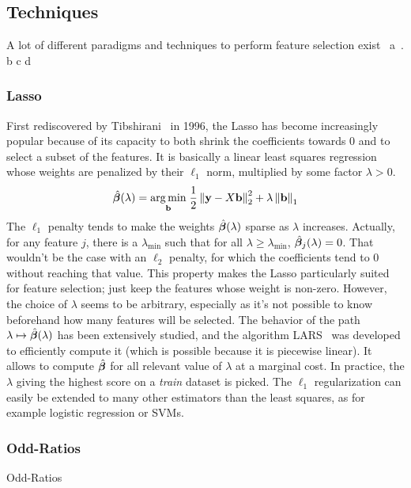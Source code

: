 \subsection{Techniques}\label{subsec:fst}

A lot of different paradigms and techniques to perform feature selection exist~\cite{intro_fs}
a~\cite{fs_text_classification}.
b\cite{gene_selection_cancer_svm}
c\cite{fs_for_classification}
d\cite{fs_for_classification_a_review}

\subsubsection{Lasso}\label{subsubsec:lasso}

First rediscovered by Tibshirani~\cite{lasso} in 1996,
the Lasso has become increasingly popular because of its capacity to both shrink
the coefficients towards 0 and to select a subset of the features.
It is basically a linear least squares regression whose weights are penalized by their $\ell_1$ norm,
multiplied by some factor $\lambda > 0$.
%
\begin{equation}\label{eq:lasso}
    \hat{\bm{\beta}}(\lambda) =
    \underset{\mathbf{b}}{\operatorname*{arg\,min}}\;
    \frac{1}{2}\left\lVert\mathbf{y} - X\mathbf{b}\right\rVert_2^2 + \lambda\left\lVert\mathbf{b}\right\rVert_1
\end{equation}
%
The $\ell_1$ penalty tends to make the weights $\hat{\bm{\beta}}(\lambda)$ sparse as $\lambda$ increases.
Actually, for any feature $j$,
there is a $\lambda_{\min}$ such that for all $\lambda \geq \lambda_{\min}$,
$\hat{\bm{\beta}}_j(\lambda) = 0$.
That wouldn't be the case with an $\ell_2$ penalty,
for which the coefficients tend to $0$ without reaching that value.
This property makes the Lasso particularly suited for feature selection;
just keep the features whose weight is non-zero.
However, the choice of $\lambda$ seems to be arbitrary,
especially as it's not possible to know beforehand how many features will be selected.
The behavior of the path $\lambda \mapsto \hat{\bm{\beta}}(\lambda)$ has been extensively studied,
and the algorithm LARS~\cite{lars} was developed to efficiently compute it
(which is possible because it is piecewise linear).
It allows to compute $\hat{\bm{\beta}}$ for all relevant value of $\lambda$ at a marginal cost.
In practice, the $\lambda$ giving the highest score on a \emph{train} dataset is picked.
The $\ell_1$ regularization can easily be extended to many other estimators than the least squares,
as for example logistic regression or SVMs.

\subsubsection{Odd-Ratios}
Odd-Ratios~\cite{odd_ratios}


